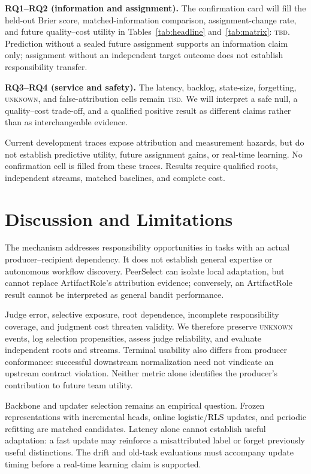 \documentclass[sigconf,anonymous]{aamas}
\newcommand{\unknown}{\textsc{unknown}}
\begin{document}
\textbf{RQ1--RQ2 (information and assignment).} The confirmation card will fill the held-out Brier score, matched-information comparison, assignment-change rate, and future quality--cost utility in Tables~\ref{tab:headline} and~\ref{tab:matrix}: \textsc{tbd}. Prediction without a sealed future assignment supports an information claim only; assignment without an independent target outcome does not establish responsibility transfer.

\textbf{RQ3--RQ4 (service and safety).} The latency, backlog, state-size, forgetting, \unknown{}, and false-attribution cells remain \textsc{tbd}. We will interpret a safe null, a quality--cost trade-off, and a qualified positive result as different claims rather than as interchangeable evidence.

Current development traces expose attribution and measurement hazards, but do not establish predictive utility, future assignment gains, or real-time learning. No confirmation cell is filled from these traces. Results require qualified roots, independent streams, matched baselines, and complete cost.

\section{Discussion and Limitations}

The mechanism addresses responsibility opportunities in tasks with an actual producer--recipient dependency. It does not establish general expertise or autonomous workflow discovery. PeerSelect can isolate local adaptation, but cannot replace ArtifactRole's attribution evidence; conversely, an ArtifactRole result cannot be interpreted as general bandit performance.

Judge error, selective exposure, root dependence, incomplete responsibility coverage, and judgment cost threaten validity. We therefore preserve \unknown{} events, log selection propensities, assess judge reliability, and evaluate independent roots and streams. Terminal usability also differs from producer conformance: successful downstream normalization need not vindicate an upstream contract violation. Neither metric alone identifies the producer's contribution to future team utility.

Backbone and updater selection remains an empirical question. Frozen representations with incremental heads, online logistic/RLS updates, and periodic refitting are matched candidates. Latency alone cannot establish useful adaptation: a fast update may reinforce a misattributed label or forget previously useful distinctions. The drift and old-task evaluations must accompany update timing before a real-time learning claim is supported.
\end{document}
